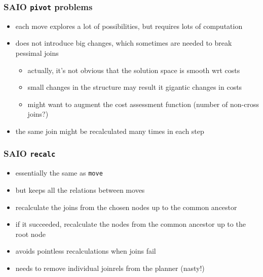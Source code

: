 \documentclass{beamer}
\begin{document}
\begin{frame}
  \frametitle{SAIO \texttt{pivot} problems}

  \begin{itemize}
  \item each move explores a lot of possibilities, but requires lots of
    computation
  \item does not introduce big changes, which sometimes are needed to break
    pessimal joins
    \begin{itemize}
    \item actually, it's not obvious that the solution space is smooth wrt
      costs
    \item small changes in the structure may result it gigantic changes in
      costs
    \item might want to augment the cost assessment function (number of
      non-cross joins?)
    \end{itemize}
  \item the same join might be recalculated many times in each step
  \end{itemize}
\end{frame}

\begin{frame}
  \frametitle{SAIO \texttt{recalc}}

  \begin{itemize}
  \item essentially the same as \texttt{move}
  \item but keeps all the relations  between moves
  \item recalculate the joins from the chosen nodes up to the common ancestor
  \item if it succeeded, recalculate the nodes from the common ancestor up to
    the root node
  \item avoids pointless recalculations when joins fail
  \item needs to remove individual joinrels from the planner (nasty!)
  \end{itemize}
\end{frame}
\end{document}
